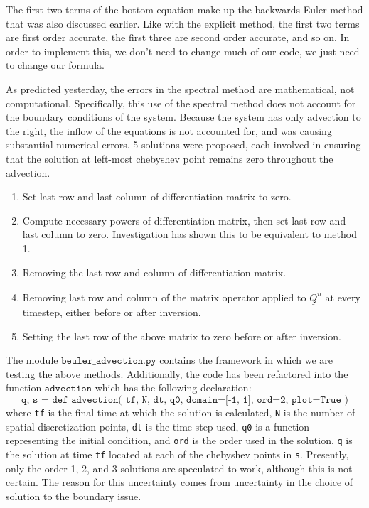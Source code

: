 \documentclass[12pt]{article}
\newcommand{\bunderline}[1]{\underline{#1}}
\renewcommand{\vec}[1]{{\bunderline{#1}}}
\begin{document}
The first two terms of the bottom equation make up the backwards Euler method that was also discussed earlier. Like with the explicit method, the first two terms are first order accurate, the first three are second order accurate, and so on. In order to implement this, we don't need to change much of our code, we just need to change our formula.

As predicted yesterday, the errors in the spectral method are mathematical, not computational.
Specifically, this use of the spectral method does not account for the boundary conditions of the system.
Because the system has only advection to the right, the inflow of the equations is not accounted for, and was causing substantial numerical errors. 
5 solutions were proposed, each involved in ensuring that the solution at left-most chebyshev point remains zero throughout the advection.
\begin{enumerate}
	\item Set last row and last column of differentiation matrix to zero.
	\item Compute necessary powers of differentiation matrix, then set last row and last column to zero.
	Investigation has shown this to be equivalent to method 1.
	\item Removing the last row and column of differentiation matrix.
	\item Removing last row and column of the matrix operator applied to $\hat{\vec{Q}^n}$ at every timestep, either before or after inversion.
	\item Setting the last row of the above matrix to zero before or after inversion.
\end{enumerate}
The module $\texttt{beuler\_advection.py}$ contains the framework in which we are testing the above methods.
Additionally, the code has been refactored into the function $\texttt{advection}$ which has the following declaration:
$$\texttt{q, s = def advection( tf, N, dt, q0, domain=[-1, 1], ord=2, plot=True )}$$
where \texttt{tf} is the final time at which the solution is calculated, \texttt{N} is the number of spatial discretization points, \texttt{dt} is the time-step used, \texttt{q0} is a function representing the initial condition, and \texttt{ord} is the order used in the solution.
\texttt{q} is the solution at time \texttt{tf} located at each of the chebyshev points in \texttt{s}. 
Presently, only the order 1, 2, and 3 solutions are speculated to work, although this is not certain.
The reason for this uncertainty comes from uncertainty in the choice of solution to the boundary issue.
\end{document}
